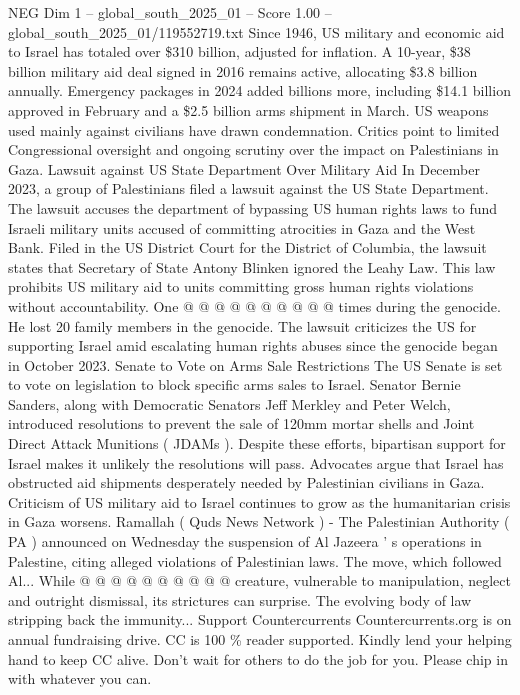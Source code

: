 \begin{textsample}{NEG Dim 1 – global\_south\_2025\_01 – Score 1.00 – global\_south\_2025\_01/119552719.txt}  \label{ex:f1_neg_150}
Since 1946, US military and economic aid to Israel has totaled over \$310 billion, adjusted for inflation.
A 10-year, \$38 billion military aid deal signed in 2016 remains active, allocating \$3.8 billion annually.
Emergency packages in 2024 added billions more, including \$14.1 billion approved in February and a \$2.5 billion arms shipment in March.
US weapons used mainly against civilians have drawn condemnation.
Critics point to limited Congressional oversight and ongoing scrutiny over the impact on Palestinians in Gaza.
Lawsuit against US State Department Over Military Aid In December 2023, a group of Palestinians filed a lawsuit against the US State Department.
The lawsuit accuses the department of bypassing US human rights laws to fund Israeli military units accused of committing atrocities in Gaza and the West Bank.
Filed in the US District Court for the District of Columbia, the lawsuit states that Secretary of State Antony Blinken ignored the Leahy Law.
This law prohibits US military aid to units committing gross human rights violations without accountability.
One @ @ @ @ @ @ @ @ @ @ times during the genocide.
He lost 20 family members in the genocide.
The lawsuit criticizes the US for supporting Israel amid escalating human rights abuses since the genocide began in October 2023.
Senate to Vote on Arms Sale Restrictions The US Senate is set to vote on legislation to block specific arms sales to Israel.
Senator Bernie Sanders, along with Democratic Senators Jeff Merkley and Peter Welch, introduced resolutions to prevent the sale of 120mm mortar shells and Joint Direct Attack Munitions ( JDAMs ).
Despite these efforts, bipartisan support for Israel makes it unlikely the resolutions will pass.
Advocates argue that Israel has obstructed aid shipments desperately needed by Palestinian civilians in Gaza.
Criticism of US military aid to Israel continues to grow as the humanitarian crisis in Gaza worsens.
Ramallah ( Quds News Network ) - The Palestinian Authority ( PA ) announced on Wednesday the suspension of Al Jazeera ' s operations in Palestine, citing alleged violations of Palestinian laws.
The move, which followed Al...
While @ @ @ @ @ @ @ @ @ @ creature, vulnerable to manipulation, neglect and outright dismissal, its strictures can surprise.
The evolving body of law stripping back the immunity...
Support Countercurrents Countercurrents.org is on annual fundraising drive.
CC is 100 \% reader supported.
Kindly lend your helping hand to keep CC alive.
Don't wait for others to do the job for you.
Please chip in with whatever you can.

\end{textsample}
